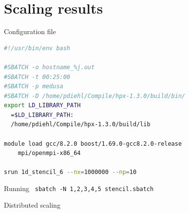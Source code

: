 \documentclass[\classoption]{beamer}
\begin{document}
\section{Scaling results}

\begin{frame}[fragile]{Configuration file}

\begin{lstlisting}[language=bash]
#!/usr/bin/env bash

#SBATCH -o hostname_%j.out
#SBATCH -t 00:25:00
#SBATCH -p medusa
#SBATCH -D /home/pdiehl/Compile/hpx-1.3.0/build/bin/
export LD_LIBRARY_PATH
  =$LD_LIBRARY_PATH:
  /home/pdiehl/Compile/hpx-1.3.0/build/lib

module load gcc/8.2.0 boost/1.69.0-gcc8.2.0-release 
	mpi/openmpi-x86_64   

srun 1d_stencil_6 --nx=1000000 --np=10 
\end{lstlisting}

\begin{block}{Running}
\lstinline| sbatch -N 1,2,3,4,5 stencil.sbatch|
\end{block}

\end{frame}

\begin{frame}{Distributed scaling}

\begin{center}
\end{center}
\end{frame}
\end{document}
